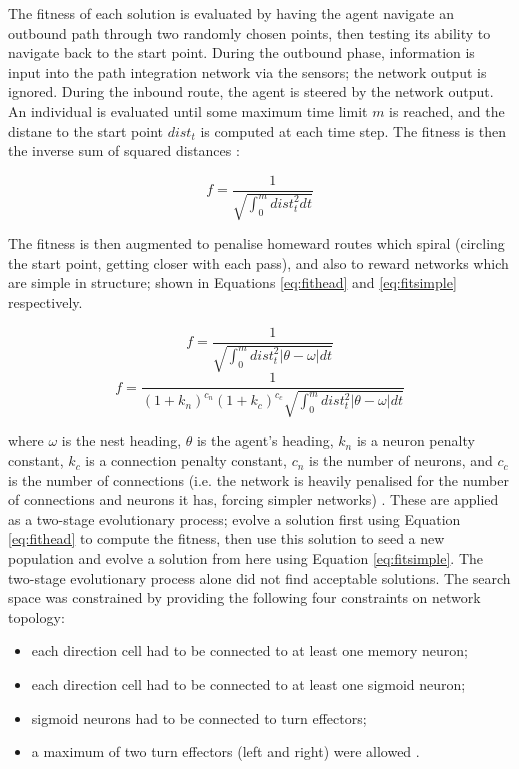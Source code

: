\documentclass[a4paper,11pt,twoside,openright]{article}
\begin{document}
The fitness of each solution is evaluated by having the agent navigate an
outbound path through two randomly chosen points, then testing its ability
to navigate back to the start point. During the outbound phase, information is
input into the path integration network via the sensors; the network output is
ignored. During the inbound route, the agent is steered by the network output.
An individual is evaluated until some maximum time limit $m$ is reached, and the
distane to the start point $dist_t$ is computed at each time step. The fitness is
then the inverse sum of squared distances \cite{Haferlach2007}:

\begin{equation}
 f = \frac{1}{\sqrt{\int_{0}^m dist_t^2 dt}}
\end{equation}

The fitness is then augmented to penalise homeward routes which
spiral (circling the start point, getting closer with each pass), and
also to reward networks which are simple in structure; shown in
Equations \ref{eq:fithead} and \ref{eq:fitsimple} respectively.

\begin{equation}
  \label{eq:fithead}
  f = \frac{1}{\sqrt{\int_{0}^m dist_t^2 |\theta - \omega | dt}}
\end{equation}
\begin{equation}
  \label{eq:fitsimple}
  f = \frac{1}{(1 + k_n)^{c_n}(1 + k_c)^{c_c}
    \sqrt{\int_{0}^m dist_t^2 |\theta - \omega | dt}}
\end{equation}

where $\omega$ is the nest heading, $\theta$ is the agent's heading,
$k_n$ is a neuron penalty constant, $k_c$ is a connection penalty
constant, $c_n$ is the number of neurons, and $c_c$ is the number of
connections (i.e.  the network is heavily penalised for the number of
connections and neurons it has, forcing simpler networks)
\cite{Haferlach2007}. These are applied as a two-stage evolutionary
process; evolve a solution first using Equation \ref{eq:fithead} to
compute the fitness, then use this solution to seed a new population
and evolve a solution from here using Equation \ref{eq:fitsimple}. The
two-stage evolutionary process alone did not find acceptable
solutions. The search space was constrained by providing the following
four constraints on network topology:

\begin{itemize}
\item{each direction cell had to be connected to at least one memory neuron;}
\item{each direction cell had to be connected to at least one sigmoid neuron;}
\item{sigmoid neurons had to be connected to turn effectors;}
\item{a maximum of two turn effectors (left and right) were allowed
  \cite{Haferlach2007}.}
\end{itemize}
\end{document}
